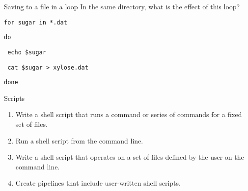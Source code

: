 \documentclass{beamer}
\begin{document}
\begin{frame}{Saving to a file in a loop }
In the same directory, what is the effect of this loop?

\begin{beamerboxesrounded}[upper=uppercolgreen,lower=lowercolgreen,shadow=false]{}
\texttt{for sugar in *.dat}

\texttt{do}

\texttt{	echo \$sugar}

\texttt{	cat \$sugar > xylose.dat}

\texttt{done}
\end{beamerboxesrounded}

\small{
}


\end{frame}

\begin{frame}{Scripts}
\begin{enumerate}
   \item{ Write a shell script that runs a command or series of commands for a fixed set of files.}
   \item{  Run a shell script from the command line.}
   \item{ Write a shell script that operates on a set of files defined by the user on the command line.}
   \item{  Create pipelines that include user-written shell scripts.}
\end{enumerate}
\end{frame}

\end{document}
